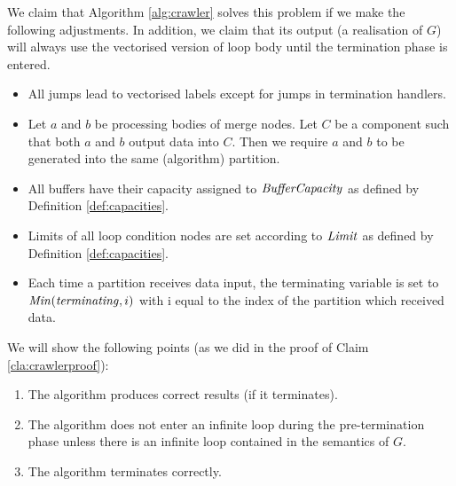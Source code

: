 %
%
%
%
%


    We claim that Algorithm \ref{alg:crawler} solves this problem if we make the following adjustments. In addition, we claim that its output (a realisation of $G$) will always use the vectorised version of loop body until the termination phase is entered.
 \begin{itemize}
   \item All jumps lead to vectorised labels except for jumps in termination handlers.
   \item Let $a$ and $b$ be processing bodies of merge nodes. Let $C$ be a component such that both $a$ and $b$ output data into $C$. Then we require $a$ and $b$ to be generated into the same (algorithm) partition.
   \item All buffers have their capacity assigned to $\mf{bufferCapacity}$ as defined by Definition \ref{def:capacities}.
   \item Limits of all loop condition nodes are set according to $\mf{limit}$ as defined by Definition \ref{def:capacities}.
   \item Each time a partition receives data input, the terminating variable is set to $\mf{min}(\mathit{terminating},i)$ with i equal to the index of the partition which received data.
 \end{itemize}
    We will show the following points (as we did in the proof of Claim \ref{cla:crawlerproof}):
\begin{enumerate}
  \item The algorithm produces correct results (if it terminates).
  \item The algorithm does not enter an infinite loop during the pre-termination phase unless there is an infinite loop contained in the semantics of $G$.
  \item The algorithm terminates correctly.
\end{enumerate}
